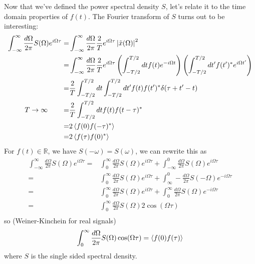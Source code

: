Now that we've defined the power spectral density $S$, let's relate it to the time domain properties of $f(t)$.
The Fourier transform of $S$ turns out to be interesting:
\begin{align*}
  \int_{-\infty}^\infty \frac{d\Omega}{2\pi} S(\Omega) e^{i \Omega \tau}
  =& \int_{-\infty}^\infty \frac{d\Omega}{2\pi} \frac{2}{T} e^{i \Omega \tau} \left\lvert \tilde{x}(\Omega) \right \rvert^2 \\
  =& \int_{-\infty}^\infty \frac{d\Omega}{2\pi} \frac{2}{T} e^{i \Omega \tau}
    \left( \int_{-T/2}^{T/2} dt f(t) e^{-i \Omega t} \right)
    \left( \int_{-T/2}^{T/2} dt' f(t')^* e^{i \Omega t'} \right) \\
  =& \frac{2}{T} \int_{-T/2}^{T/2} dt \int_{-T/2}^{T/2} dt' f(t) f(t')^* \delta(\tau + t' - t) \\
  T \to \infty \qquad =& \frac{2}{T} \int_{-T/2}^{T/2} dt f(t) f(t - \tau)^* \\
  =& 2 \left \langle f(0)f(-\tau)^* \right \rangle \\
  =& 2 \left \langle f(\tau) f(0)^* \right \rangle
\end{align*}
For $f(t) \in \mathbb{R}$, we have $S(-\omega) = S(\omega)$, we can rewrite this as
\begin{align*}
  \int_{-\infty}^\infty \frac{d\Omega}{2\pi} S(\Omega) e^{i \Omega \tau}
  =& \int_0^\infty \frac{d\Omega}{2\pi} S(\Omega) e^{i \Omega \tau} + \int_{-\infty}^0 \frac{d\Omega}{2\pi} S(\Omega) e^{i \Omega \tau} \\
  =& \int_0^\infty \frac{d\Omega}{2\pi} S(\Omega) e^{i \Omega \tau} + \int_{\infty}^0 - \frac{d\Omega}{2\pi} S(-\Omega) e^{-i \Omega \tau} \\
  =& \int_0^\infty \frac{d\Omega}{2\pi} S(\Omega) e^{i \Omega \tau} + \int_0^\infty \frac{d\Omega}{2\pi} S(\Omega) e^{-i \Omega \tau} \\
  =& \int_0^\infty \frac{d\Omega}{2\pi} S(\Omega) 2 \cos(\Omega \tau) \\
\end{align*}
so (Weiner-Kinchein for real signals)
\begin{equation*}
\int_0^\infty \frac{d\Omega}{2\pi} S(\Omega) \cos(\Omega \tau) = \left \langle f(0) f(\tau) \right \rangle
\end{equation*}
where $S$ is the single sided spectral density.
